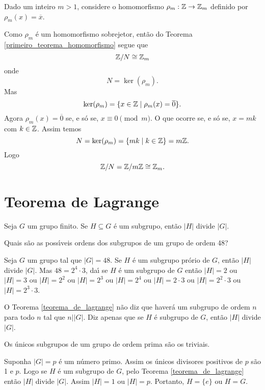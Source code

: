 \begin{exemplo}
    Dado um inteiro $m > 1$, considere o homomorfismo $\rho_m : \mathbb{Z} \to \mathbb{Z}_m$ definido por $\rho_m(x) = \overline{x}$.
\end{exemplo}
\begin{solucao}
	Como $\rho_m$ \'e um homomorfismo sobrejetor, ent\~ao do Teorema \ref{primeiro_teorema_homomorfismo} segue que
	\[
		\mathbb{Z}/N \cong \mathbb{Z}_m
	\]
	onde
	\[
		N = \ker(\rho_m).
	\]
	Mas
	\[
		\ker(\rho_m) = \{x \in \mathbb{Z} \mid \rho_m(x) = \overline{0}\}.
	\]
	Agora $\rho_m(x) = \overline{0}$ se, e s\'o se, $x \equiv 0 \pmod m$. O que ocorre se, e s\'o se, $x = mk$ com $k \in \mathbb{Z}$. Assim temos
	\[
		N = \ker(\rho_m) = \{mk \mid k \in \mathbb{Z}\} = m\mathbb{Z}.
	\]
	Logo
	\[
		\mathbb{Z}/N = \mathbb{Z}/m\mathbb{Z} \cong \mathbb{Z}_m.
	\]
\end{solucao}

\section{Teorema de Lagrange}

\begin{teorema}\label{teorema_de_lagrange}
	Seja $G$ um grupo finito. Se $H\subseteq G$ {\'e} um subgrupo, ent{\~a}o $|H|$ divide $|G|$.
\end{teorema}

\begin{exemplo}
	Quais s{\~a}o as poss{\'\i}veis ordens dos subgrupos de um grupo de ordem 48?
	\begin{solucao}
		Seja $G$ um grupo tal que $|G|=48$. Se $H$ {\'e} um subgrupo pr\'orio de $G$, ent{\~a}o $|H|$ divide $|G|$. Mas $48=2^{4}\cdot 3$, da{\'\i} se $H$ \'e um subgrupo de $G$ ent\~ao $|H|=2$ ou $|H|=3$ ou $|H|= 2^{2}$ ou $|H|=2^{3}$ ou $|H|=2^{4}$ ou $|H|=2\cdot3$ ou $|H|=2^2\cdot 3$ ou $|H|=2^3\cdot 3$.
	\end{solucao}
\end{exemplo}

\begin{observacao}
	O Teorema \ref{teorema_de_lagrange} n{\~a}o diz que haver{\'a} um subgrupo de ordem $n$ para todo $n$ tal que $n||G|$. Diz apenas que se $H$ {\'e} subgrupo de $G$, ent{\~a}o $|H|$ divide $|G|$.
\end{observacao}

\begin{corolario}
	Os {\'u}nicos subgrupos de um grupo de ordem prima s{\~a}o os triviais.
\end{corolario}
\begin{prova}
	Suponha $|G| = p$ \'e um n\'umero primo. Assim os {\'u}nicos divisores positivos de $p$ s{\~a}o 1 e $p$. Logo se $H$ {\'e} um subgrupo de $G$, pelo Teorema \ref{teorema_de_lagrange} ent{\~a}o $|H|$ divide $|G|$. Assim $|H| = 1$ ou $|H| = p$. Portanto, $H=\{e\}$ ou $H = G$.
\end{prova}